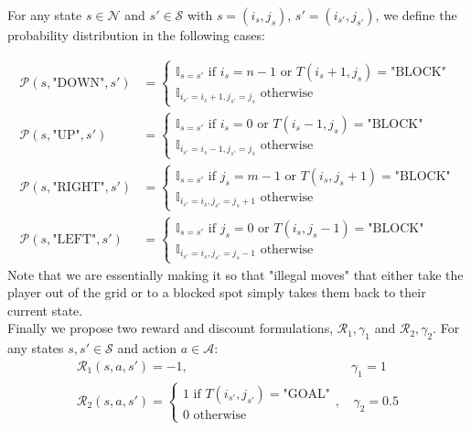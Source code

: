 \documentclass{article}[12pt]
\begin{document}
For any state $ s\in \mathcal{N}$  and $ s'\in \mathcal{S}$ with $s = (i_s, j_s)$, $s' = (i_{s'}, j_{s'})$, we define the probability distribution in the following cases:

\begin{align*}
\mathcal{P}(s, \text{"DOWN"}, s') &= \begin{cases} \mathbb{I}_{s=s'} \text{  if $i_s = n-1$ or $T(i_s +1, j_s) =$"BLOCK"}\\\mathbb{I}_{i_{s'}=i_s+1, j_{s'}=j_s} \text{ otherwise} \end{cases}\\
\mathcal{P}(s, \text{"UP"}, s') &= \begin{cases} \mathbb{I}_{s=s'} \text{  if $i_s = 0$ or $T(i_s -1, j_s) =$"BLOCK"}\\\mathbb{I}_{i_{s'}=i_s-1, j_{s'}=j_s} \text{ otherwise} \end{cases}\\
\mathcal{P}(s, \text{"RIGHT"}, s')& = \begin{cases} \mathbb{I}_{s=s'} \text{  if $j_s = m-1$ or $T(i_s, j_s+1) =$"BLOCK"}\\\mathbb{I}_{i_{s'}=i_s, j_{s'}=j_s+1} \text{ otherwise} \end{cases}\\
\mathcal{P}(s, \text{"LEFT"}, s') &= \begin{cases} \mathbb{I}_{s=s'} \text{  if $j_s = 0$ or $T(i_s, j_s-1) =$"BLOCK"}\\\mathbb{I}_{i_{s'}=i_s, j_{s'}=j_s-1} \text{ otherwise} \end{cases}
\end{align*}
Note that we are essentially making it so that "illegal moves" that either take the player out of the grid or to a blocked spot simply takes them back to their current state.\\

Finally we propose two reward and discount formulations, $\mathcal{R}_1,\gamma_1$ and  $\mathcal{R}_2, \gamma_2$. For any states $s,s'\in \mathcal{S}$ and action $a\in \mathcal{A}$:
\begin{align*}
\mathcal{R}_1(s, a, s') = -1,\,& \gamma_1 = 1\\
\mathcal{R}_2(s, a, s') = \begin{cases}1 \text{ if $T(i_{s'},j_{s'}) =$"GOAL"}\\ 0 \text{ otherwise}\end{cases},&\, \gamma_2 = 0.5\\
\end{align*}
\end{document}
